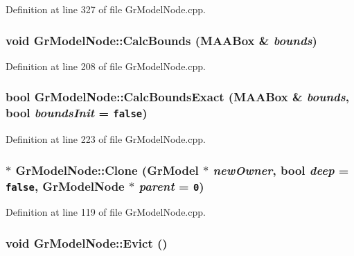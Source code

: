 Definition at line 327 of file GrModelNode.cpp.\hypertarget{class_gr_model_node_91040763448f20348673c730e8e6fbf8}{
\subsubsection[{CalcBounds}]{\setlength{\rightskip}{0pt plus 5cm}void GrModelNode::CalcBounds ({\bf MAABox} \& {\em bounds})}}
\label{class_gr_model_node_91040763448f20348673c730e8e6fbf8}




Definition at line 208 of file GrModelNode.cpp.\hypertarget{class_gr_model_node_3bc9a825d5c12c5f8484a869e992ac0f}{
\subsubsection[{CalcBoundsExact}]{\setlength{\rightskip}{0pt plus 5cm}bool GrModelNode::CalcBoundsExact ({\bf MAABox} \& {\em bounds}, \/  bool {\em boundsInit} = {\tt false})}}
\label{class_gr_model_node_3bc9a825d5c12c5f8484a869e992ac0f}




Definition at line 223 of file GrModelNode.cpp.\hypertarget{class_gr_model_node_6bcd4b9a2763671b7bd20a5556aa1a22}{
\subsubsection[{Clone}]{ $\ast$ GrModelNode::Clone ({\bf GrModel} $\ast$ {\em newOwner}, \/  bool {\em deep} = {\tt false}, \/  {\bf GrModelNode} $\ast$ {\em parent} = {\tt 0})}}
\label{class_gr_model_node_6bcd4b9a2763671b7bd20a5556aa1a22}




Definition at line 119 of file GrModelNode.cpp.\hypertarget{class_gr_model_node_598ada3ae0f7b3028d0b9f3cff6c1edd}{
\subsubsection[{Evict}]{\setlength{\rightskip}{0pt plus 5cm}void GrModelNode::Evict ()}}
\label{class_gr_model_node_598ada3ae0f7b3028d0b9f3cff6c1edd}




